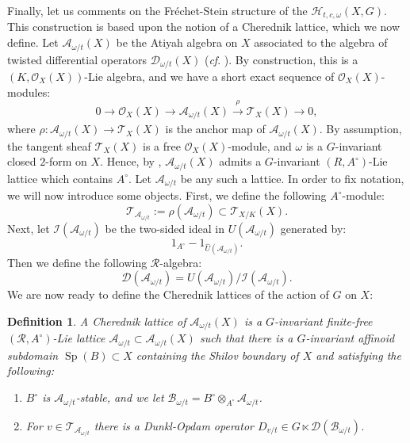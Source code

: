 \documentclass{amsart}
\newtheorem{defi}{ Definition}[subsection]
\newcommand{\Sp}{\operatorname{Sp}}
\newcommand{\D}{\mathcal{D}}
\newcommand{\OX}{\mathcal{O}}
\begin{document}
Finally, let us comments on the Fréchet-Stein structure of the $\mathcal{H}_{t,c,\omega}(X,G)$. This construction is based upon the notion of a Cherednik lattice, which we now define. Let $\mathcal{A}_{\omega/t}(X)$ be the Atiyah algebra on $X$ associated to the algebra of twisted differential operators $\D_{\omega/t}(X)$ (\emph{cf}. \cite[Section 2.3]{p-adicCheralg}). By construction, this is a $(K,\OX_X(X))$-Lie algebra, and we have a short exact sequence of $\OX_X(X)$-modules:
\begin{equation*}
   0\rightarrow \OX_X(X)\rightarrow \mathcal{A}_{\omega/t}(X) \xrightarrow[]{\rho}\mathcal{T}_X(X)\rightarrow 0,
\end{equation*}
where $\rho:\mathcal{A}_{\omega/t}(X)\rightarrow \mathcal{T}_X(X)$ is the anchor map of $\mathcal{A}_{\omega/t}(X)$. By assumption, the tangent sheaf $\mathcal{T}_X(X)$ is a free $\OX_X(X)$-module, and $\omega$ is a $G$-invariant closed $2$-form on $X$.  Hence, by \cite[Lemma 2.4.5]{p-adicCheralg}, $\mathcal{A}_{\omega/t}(X)$
admits a $G$-invariant $(R,A^{\circ})$-Lie lattice which contains $A^{\circ}$. Let $\mathscr{A}_{\omega/t}$ be any such a lattice. In order to fix notation, we will now introduce some objects. First, we define the following $A^{\circ}$-module:
\begin{equation*}
    \mathscr{T}_{\mathscr{A}_{\omega/t}}:=\rho(\mathscr{A}_{\omega/t})\subset \mathcal{T}_{X/K}(X).
\end{equation*}
Next, let $\mathcal{I}(\mathscr{A}_{\omega/t})$ be the two-sided ideal in $U(\mathscr{A}_{\omega/t})$ generated by:
\begin{equation*}
    1_{A^{\circ}}-1_{\widehat{U}(\mathscr{A}_{\omega/t})}.
\end{equation*}
Then we define the following $\mathcal{R}$-algebra:
 \begin{equation*}
\D(\mathscr{A}_{\omega/t})=U(\mathscr{A}_{\omega/t})/\mathcal{I}(\mathscr{A}_{\omega/t}).
 \end{equation*}
We are now ready to define the Cherednik lattices of the action of $G$ on $X$:
\begin{defi}
A Cherednik lattice of $\mathcal{A}_{\omega/t}(X)$ is a  $G$-invariant finite-free $(\mathcal{R},A^{\circ})$-Lie lattice $\mathscr{A}_{\omega/t}\subset \mathcal{A}_{\omega/t}(X)$ such that there is a  $G$-invariant affinoid subdomain $\Sp(B)\subset X$ containing the Shilov boundary of $X$ and satisfying the following:
 \begin{enumerate}[label=(\roman*)]
       \item $B^{\circ}$ is $\mathscr{A}_{\omega/t}$-stable, and we let $\mathscr{B}_{\omega/t}=B^{\circ}\otimes_{A^{\circ}}\mathscr{A}_{\omega/t}$.
       \item  For $v\in \mathscr{T}_{\mathscr{A}_{\omega/t}}$ there is a Dunkl-Opdam operator $D_{v/t}\in G\ltimes\D(\mathscr{B}_{\omega/t})$.
   \end{enumerate}
\end{defi}
\end{document}
